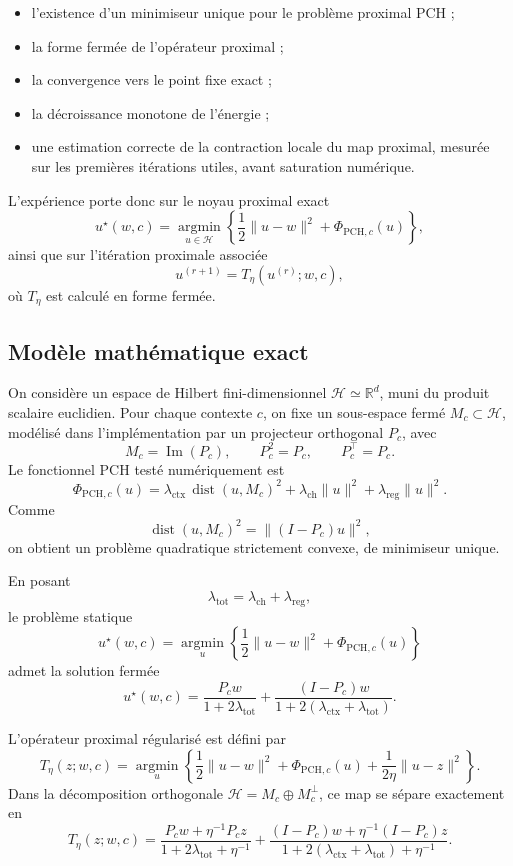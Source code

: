 \documentclass[11pt,a4paper]{article}
\newcommand{\1}{\mathbf 1}
\begin{document}
\begin{itemize}
    \item l'existence d'un minimiseur unique pour le problème proximal PCH ;
    \item la forme fermée de l'opérateur proximal ;
    \item la convergence vers le point fixe exact ;
    \item la décroissance monotone de l'énergie ;
    \item une estimation correcte de la contraction locale du map proximal, mesurée sur les premières itérations utiles, avant saturation numérique.
\end{itemize}

L'expérience porte donc sur le noyau proximal exact
\[
u^\star(w,c)
=
\operatorname*{argmin}_{u\in\mathcal H}
\left\{
\frac12\|u-w\|^2 + \Phi_{\mathrm{PCH},c}(u)
\right\},
\]
ainsi que sur l'itération proximale associée
\[
u^{(r+1)} = T_\eta(u^{(r)};w,c),
\]
où \(T_\eta\) est calculé en forme fermée.

\subsection{Modèle mathématique exact}

On considère un espace de Hilbert fini-dimensionnel \(\mathcal H \simeq \mathbb R^d\), muni du produit scalaire euclidien.
Pour chaque contexte \(c\), on fixe un sous-espace fermé \(M_c\subset\mathcal H\), modélisé dans l'implémentation par un projecteur orthogonal \(P_c\), avec
\[
M_c = \operatorname{Im}(P_c),
\qquad
P_c^2=P_c,
\qquad
P_c^\top=P_c.
\]
Le fonctionnel PCH testé numériquement est
\[
\Phi_{\mathrm{PCH},c}(u)
=
\lambda_{\mathrm{ctx}}\,\operatorname{dist}(u,M_c)^2
+
\lambda_{\mathrm{ch}}\|u\|^2
+
\lambda_{\mathrm{reg}}\|u\|^2.
\]
Comme
\[
\operatorname{dist}(u,M_c)^2 = \|(I-P_c)u\|^2,
\]
on obtient un problème quadratique strictement convexe, de minimiseur unique.

En posant
\[
\lambda_{\mathrm{tot}}=\lambda_{\mathrm{ch}}+\lambda_{\mathrm{reg}},
\]
le problème statique
\[
u^\star(w,c)
=
\operatorname*{argmin}_{u}
\left\{
\frac12\|u-w\|^2+\Phi_{\mathrm{PCH},c}(u)
\right\}
\]
admet la solution fermée
\[
u^\star(w,c)
=
\frac{P_c w}{1+2\lambda_{\mathrm{tot}}}
+
\frac{(I-P_c)w}{1+2(\lambda_{\mathrm{ctx}}+\lambda_{\mathrm{tot}})}.
\]

L'opérateur proximal régularisé est défini par
\[
T_\eta(z;w,c)
=
\operatorname*{argmin}_{u}
\left\{
\frac12\|u-w\|^2+\Phi_{\mathrm{PCH},c}(u)+\frac{1}{2\eta}\|u-z\|^2
\right\}.
\]
Dans la décomposition orthogonale \(\mathcal H=M_c\oplus M_c^\perp\), ce map se sépare exactement en
\[
T_\eta(z;w,c)
=
\frac{P_c w + \eta^{-1}P_c z}{1+2\lambda_{\mathrm{tot}}+\eta^{-1}}
+
\frac{(I-P_c)w + \eta^{-1}(I-P_c)z}{1+2(\lambda_{\mathrm{ctx}}+\lambda_{\mathrm{tot}})+\eta^{-1}}.
\]
\end{document}
